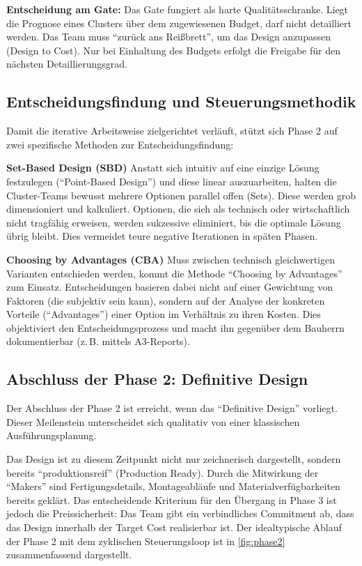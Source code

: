 \textbf{Entscheidung am Gate:}
Das Gate fungiert als harte Qualitätsschranke. Liegt die Prognose eines Clusters über dem zugewiesenen Budget, darf nicht detailliert werden. Das Team muss \enquote{zurück ans Reißbrett}, um das Design anzupassen (Design to Cost). Nur bei Einhaltung des Budgets erfolgt die Freigabe für den nächsten Detaillierungsgrad.\autocite[Vgl.][S.~125]{hill_target_2017}

\subsection{Entscheidungsfindung und Steuerungsmethodik}
\label{sec:4.4.5}
Damit die iterative Arbeitsweise zielgerichtet verläuft, stützt sich Phase 2 auf zwei spezifische Methoden zur Entscheidungsfindung:

\textbf{Set-Based Design (SBD)}
Anstatt sich intuitiv auf eine einzige Lösung festzulegen (\enquote{Point-Based Design}) und diese linear auszuarbeiten, halten die Cluster-Teams bewusst mehrere Optionen parallel offen (Sets). Diese werden grob dimensioniert und kalkuliert. Optionen, die sich als technisch oder wirtschaftlich nicht tragfähig erweisen, werden sukzessive eliminiert, bis die optimale Lösung übrig bleibt. Dies vermeidet teure negative Iterationen in späten Phasen.\autocite[Vgl.][S.~24]{ballard_target_2025}

\textbf{Choosing by Advantages (\acs{CBA})}
Muss zwischen technisch gleichwertigen Varianten entschieden werden, kommt die Methode \enquote{Choosing by Advantages} zum Einsatz. Entscheidungen basieren dabei nicht auf einer Gewichtung von Faktoren (die subjektiv sein kann), sondern auf der Analyse der konkreten Vorteile (\enquote{Advantages}) einer Option im Verhältnis zu ihren Kosten. Dies objektiviert den Entscheidungsprozess und macht ihn gegenüber dem Bauherrn dokumentierbar (z.\,B. mittels A3-Reports).\autocite[Vgl.][S.~25]{ballard_target_2025}

\subsection{Abschluss der Phase 2: Definitive Design}
\label{sec:4.4.6}
Der Abschluss der Phase 2 ist erreicht, wenn das \enquote{Definitive Design} vorliegt. Dieser Meilenstein unterscheidet sich qualitativ von einer klassischen Ausführungsplanung.

Das Design ist zu diesem Zeitpunkt nicht nur zeichnerisch dargestellt, sondern bereits \enquote{produktionsreif} (Production Ready). Durch die Mitwirkung der \enquote{Makers} sind Fertigungsdetails, Montageabläufe und Materialverfügbarkeiten bereits geklärt.
Das entscheidende Kriterium für den Übergang in Phase 3 ist jedoch die Preissicherheit: Das Team gibt ein verbindliches Commitment ab, dass das Design innerhalb der Target Cost realisierbar ist.\autocite[Vgl.][S.~137]{ballard_target_2025} Der idealtypische Ablauf der Phase 2 mit dem zyklischen Steuerungsloop ist in \cref{fig:phase2} zusammenfassend dargestellt.

